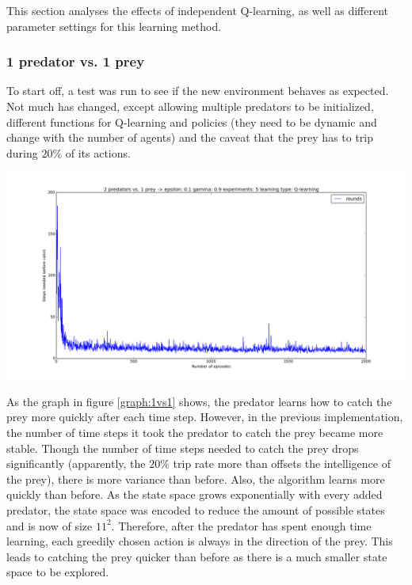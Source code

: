 This section analyses the effects of independent Q-learning, as well as different parameter settings for this learning method.
\subsubsection{1 predator vs. 1 prey}
To start off, a test was run to see if the new environment behaves as expected. Not much has changed, except allowing multiple predators to be initialized, different functions for Q-learning and policies (they need to be dynamic and change with the number of agents) and the caveat that the prey has to trip during $20\%$ of its actions.

\begin{center}
	\includegraphics[scale=0.3]{1_predator_1_prey_q_learning}
	\label{graph:1vs1}
\end{center}

As the graph in figure \ref{graph:1vs1} shows, the predator learns how to catch the prey more quickly after each time step. However, in the previous implementation, the number of time steps it took the predator to catch the prey became more stable. Though the number of time steps needed to catch the prey drops significantly (apparently, the $20\%$ trip rate more than offsets the intelligence of the prey), there is more variance than before. Also, the algorithm learns more quickly than before. As the state space grows exponentially with every added predator,  the state space was encoded to reduce the amount of possible states and is now of size $11^2$. Therefore, after the predator has spent enough time learning, each greedily chosen action is always in the direction of the prey. This leads to catching the prey quicker than before as there is a much smaller state space to be explored.

